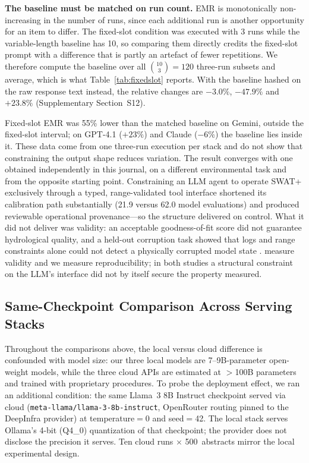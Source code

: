 \documentclass[preprint,review,12pt,authoryear]{elsarticle}
\begin{document}
\noindent \textbf{The baseline must be matched on run count.} EMR is monotonically non-increasing in the number of runs, since each additional run is another opportunity for an item to differ. The fixed-slot condition was executed with 3 runs while the variable-length baseline has 10, so comparing them directly credits the fixed-slot prompt with a difference that is partly an artefact of fewer repetitions. We therefore compute the baseline over all $\binom{10}{3}{=}120$ three-run subsets and average, which is what Table~\ref{tab:fixedslot} reports. With the baseline hashed on the raw response text instead, the relative changes are $-3.0\%$, $-47.9\%$ and $+23.8\%$ (Supplementary Section~S12).

\noindent Fixed-slot EMR was 55\% lower than the matched baseline on Gemini, outside the fixed-slot interval; on GPT-4.1 ($+23\%$) and Claude ($-6\%$) the baseline lies inside it. These data come from one three-run execution per stack and do not show that constraining the output shape reduces variation.
The result converges with one obtained independently in this journal, on a different environmental task and from the opposite starting point. Constraining an LLM agent to operate SWAT+ exclusively through a typed, range-validated tool interface shortened its calibration path substantially (21.9 versus 62.0 model evaluations) and produced reviewable operational provenance---so the structure delivered on control. What it did not deliver was validity: an acceptable goodness-of-fit score did not guarantee hydrological quality, and a held-out corruption task showed that logs and range constraints alone could not detect a physically corrupted model state \citep{park2026toolinterfaces}. \citeauthor{park2026toolinterfaces} measure validity and we measure reproducibility; in both studies a structural constraint on the LLM's interface did not by itself secure the property measured.

\subsection{Same-Checkpoint Comparison Across Serving Stacks}
\label{sec:desconfound}

Throughout the comparisons above, the local versus cloud difference is confounded with model size: our three local models are 7--9B-parameter open-weight models, while the three cloud APIs are estimated at $>$100B parameters and trained with proprietary procedures.
To probe the deployment effect, we ran an additional condition: the same Llama~3 8B Instruct checkpoint served via cloud (\texttt{meta-llama/llama-3-8b-instruct}, OpenRouter routing pinned to the DeepInfra provider) at temperature${=}$0 and seed${=}$42. The local stack serves Ollama's 4-bit (Q4\_0) quantization of that checkpoint; the provider does not disclose the precision it serves.
Ten cloud runs $\times$ 500~abstracts mirror the local experimental design.
\end{document}
